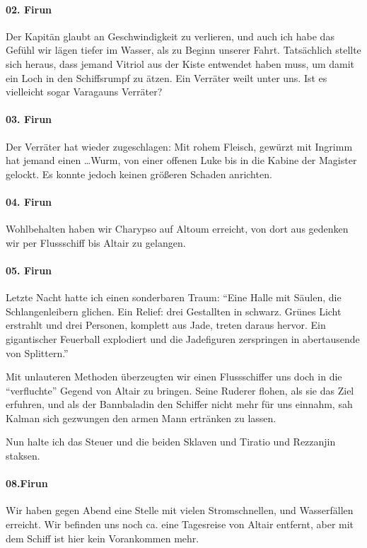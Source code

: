 \paragraph{02. Firun}
Der Kapitän glaubt an Geschwindigkeit zu verlieren, und auch ich habe das Gefühl wir lägen tiefer im Wasser, als zu Beginn unserer Fahrt.
Tatsächlich stellte sich heraus, dass jemand Vitriol aus der Kiste entwendet haben muss, um damit ein Loch in den Schiffsrumpf zu ätzen. Ein Verräter weilt unter uns. Ist es vielleicht sogar Varagauns Verräter?

\paragraph{03. Firun}
Der Verräter hat wieder zugeschlagen: Mit rohem Fleisch, gewürzt mit Ingrimm hat jemand einen \dots Wurm, von einer offenen Luke bis in die Kabine der Magister gelockt. Es konnte jedoch keinen größeren Schaden anrichten.

\paragraph{04. Firun}
Wohlbehalten haben wir Charypso auf Altoum erreicht, von dort aus gedenken wir per Flussschiff bis Altair zu gelangen.

\paragraph{05. Firun}
Letzte Nacht hatte ich einen sonderbaren Traum:
``Eine Halle mit Säulen, die Schlangenleibern glichen. Ein Relief: drei Gestallten in schwarz. Grünes Licht erstrahlt und drei Personen, komplett aus Jade, treten daraus hervor. Ein gigantischer Feuerball explodiert und die Jadefiguren zerspringen in abertausende von Splittern.''

Mit unlauteren Methoden überzeugten wir einen Flussschiffer uns doch in die ``verfluchte'' Gegend von Altair zu bringen. Seine Ruderer flohen, als sie das Ziel erfuhren, und als der Bannbaladin den Schiffer nicht mehr für uns einnahm, sah Kalman sich gezwungen den armen Mann ertränken zu lassen.

Nun halte ich das Steuer und die beiden Sklaven und Tiratio und Rezzanjin staksen.

\paragraph{08.Firun}
Wir haben gegen Abend eine Stelle mit vielen Stromschnellen, und Wasserfällen erreicht. Wir befinden uns noch ca. eine Tagesreise von Altair entfernt, aber mit dem Schiff ist hier kein Vorankommen mehr.

